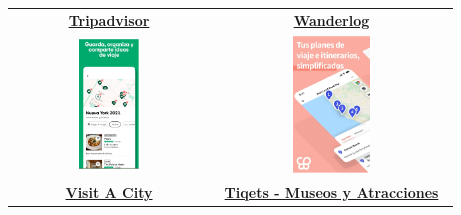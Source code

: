 \begin{table}[h!]
	\centering
	\renewcommand{\arraystretch}{1.5} %
	\begin{tabular}{cc}
	\hline
	\href{https://play.google.com/store/apps/details?id=com.tripadvisor.tripadvisor}{\textbf{Tripadvisor}} & \href{https://play.google.com/store/apps/details?id=com.wanderlog.wanderlog}{\textbf{Wanderlog}} \\
	\includegraphics[width=0.32\textwidth]{img/tripadvisor.png} & \includegraphics[width=0.34\textwidth]{img/wanderlog.png} \\
	\hline
	\href{https://play.google.com/store/apps/details?id=com.visitacity}{\textbf{Visit A City}} & \href{https://play.google.com/store/apps/details?id=com.tiqets.tiqetsapp}{\textbf{Tiqets - Museos y Atracciones}} \\

\end{tabular}
\end{table}
